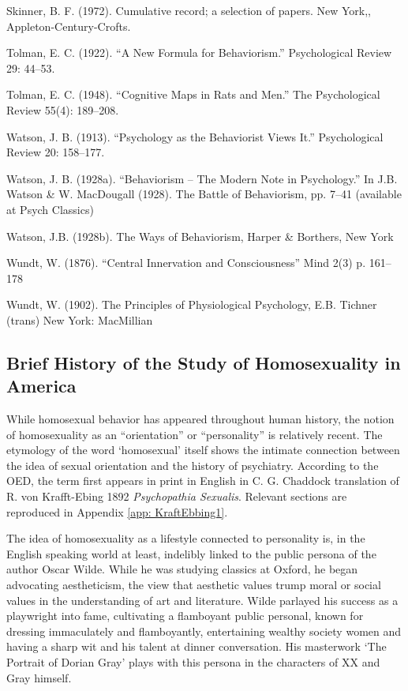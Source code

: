 Skinner, B. F. (1972). Cumulative record; a selection of papers. New York,, Appleton-Century-Crofts.

Tolman, E. C. (1922). ``A New Formula for Behaviorism.'' Psychological Review 29: 44--53.

Tolman, E. C. (1948). ``Cognitive Maps in Rats and Men.'' The Psychological Review 55(4): 189--208.

Watson, J. B. (1913). ``Psychology as the Behaviorist Views It.'' Psychological Review 20: 158--177.

Watson, J. B. (1928a). ``Behaviorism -- The Modern Note in Psychology.'' In J.B. Watson \& W. MacDougall (1928). The Battle of Behaviorism, pp. 7--41 (available at Psych Classics)

Watson, J.B. (1928b). The Ways of Behaviorism, Harper \& Borthers, New York

Wundt, W. (1876). “Central Innervation and Consciousness” Mind 2(3) p. 161--178

Wundt, W. (1902). The Principles of Physiological Psychology, E.B. Tichner (trans) New York: MacMillian

\subsection{Brief History of the Study of Homosexuality in America}
\label{briefhistoryofthestudyofhomosexualityinamerica}

While homosexual behavior has appeared throughout human history, the notion of homosexuality as an “orientation” or “personality” is relatively recent. The etymology of the word `homosexual' itself shows the intimate connection between the idea of sexual orientation and the history of psychiatry. According to the OED, the term first appears in print in English in C. G. Chaddock translation of R. von Krafft-Ebing 1892 \emph{Psychopathia Sexualis}. Relevant sections are reproduced in Appendix \ref{app: KraftEbbing1}.

The idea of homosexuality as a lifestyle connected to personality is, in the English speaking world at least, indelibly linked to the public persona of the author Oscar Wilde. While he was studying classics at Oxford, he began advocating aestheticism, the view that aesthetic values trump moral or social values in the understanding of art and literature. Wilde parlayed his success as a playwright into fame, cultivating a flamboyant public personal, known for dressing immaculately and flamboyantly, entertaining wealthy society women and having a sharp wit and his talent at dinner conversation. His masterwork ‘The Portrait of Dorian Gray’ plays with this persona in the characters of XX and Gray himself.

